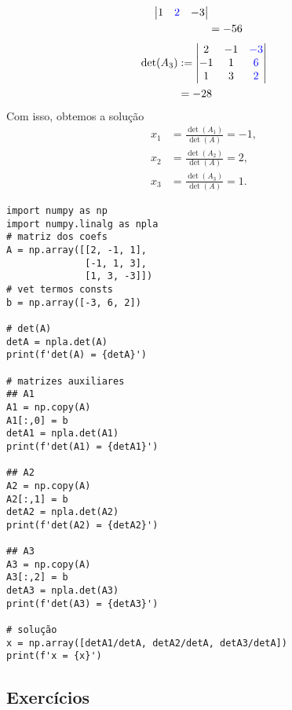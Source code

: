 \begin{ex}
\begin{subequations}
\begin{align}
\begin{vmatrix}
                  1 & {\color{blue}2} & -3
                \end{vmatrix}\\
              &= -56
    \end{align}
  \end{subequations}
  \begin{subequations}
    \begin{align}
      \det(A_3) &:=
                \begin{vmatrix}
                  2 & -1 & {\color{blue}-3}\\
                  -1 & 1 & {\color{blue}6}\\
                  1 & 3 & {\color{blue}2}
                \end{vmatrix}\\
              &= -28
    \end{align}
  \end{subequations}
  Com isso, obtemos a solução
  \begin{subequations}
    \begin{align}
      x_1 &= \frac{\det(A_1)}{\det(A)} = -1,\\
      x_2 &= \frac{\det(A_2)}{\det(A)} = 2,\\
      x_3 &= \frac{\det(A_3)}{\det(A)} = 1.
    \end{align}
  \end{subequations}

\begin{lstlisting}
import numpy as np
import numpy.linalg as npla
# matriz dos coefs
A = np.array([[2, -1, 1],
              [-1, 1, 3],
              [1, 3, -3]])
# vet termos consts
b = np.array([-3, 6, 2])

# det(A)
detA = npla.det(A)
print(f'det(A) = {detA}')

# matrizes auxiliares
## A1
A1 = np.copy(A)
A1[:,0] = b
detA1 = npla.det(A1)
print(f'det(A1) = {detA1}')

## A2
A2 = np.copy(A)
A2[:,1] = b
detA2 = npla.det(A2)
print(f'det(A2) = {detA2}')

## A3
A3 = np.copy(A)
A3[:,2] = b
detA3 = npla.det(A3)
print(f'det(A3) = {detA3}')

# solução
x = np.array([detA1/detA, detA2/detA, detA3/detA])
print(f'x = {x}')
\end{lstlisting}

\end{ex}


\subsection{Exercícios}

